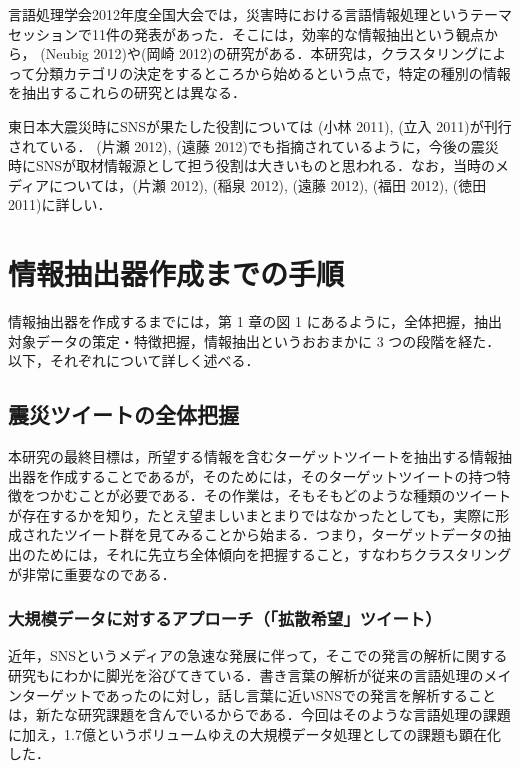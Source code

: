\documentclass[japanese]{jnlp_1.4}
\begin{document}
言語処理学会2012年度全国大会では，災害時における言語情報処理というテーマセッションで11件の発表があった．そこには，効率的な情報抽出という観点から， 
(Neubig 2012)や(岡崎 
2012)の研究がある．本研究は，クラスタリングによって分類カテゴリの決定をするところから始めるという点で，特定の種別の情報を抽出するこれらの研究とは異なる．

東日本大震災時にSNSが果たした役割については (小林 2011), (立入 2011)が刊行されている． (片瀬 2012), (遠藤 2012)でも指摘されているように，今後の震災時にSNSが取材情報源として担う役割は大きいものと思われる．なお，当時のメディアについては，(片瀬 2012), (稲泉 2012), (遠藤 2012), (福田 2012), (徳田 2011)に詳しい．



\section{情報抽出器作成までの手順}

情報抽出器を作成するまでには，第 1 章の図 1 にあるように，全体把握，抽出対象データの策定・特徴把握，情報抽出というおおまかに 3 つの段階を経た．以下，それぞれについて詳しく述べる．


\subsection{震災ツイートの全体把握}

本研究の最終目標は，所望する情報を含むターゲットツイートを抽出する情報抽出器を作成することであるが，そのためには，そのターゲットツイートの持つ特徴をつかむことが必要である．その作業は，そもそもどのような種類のツイートが存在するかを知り，たとえ望ましいまとまりではなかったとしても，実際に形成されたツイート群を見てみることから始まる．つまり，ターゲットデータの抽出のためには，それに先立ち全体傾向を把握すること，すなわちクラスタリングが非常に重要なのである．


\subsubsection{大規模データに対するアプローチ（「拡散希望」ツイート）}

近年，SNSというメディアの急速な発展に伴って，そこでの発言の解析に関する研究もにわかに脚光を浴びてきている．書き言葉の解析が従来の言語処理のメインターゲットであったのに対し，話し言葉に近いSNSでの発言を解析することは，新たな研究課題を含んでいるからである．今回はそのような言語処理の課題に加え，1.7億というボリュームゆえの大規模データ処理としての課題も顕在化した．
\end{document}
